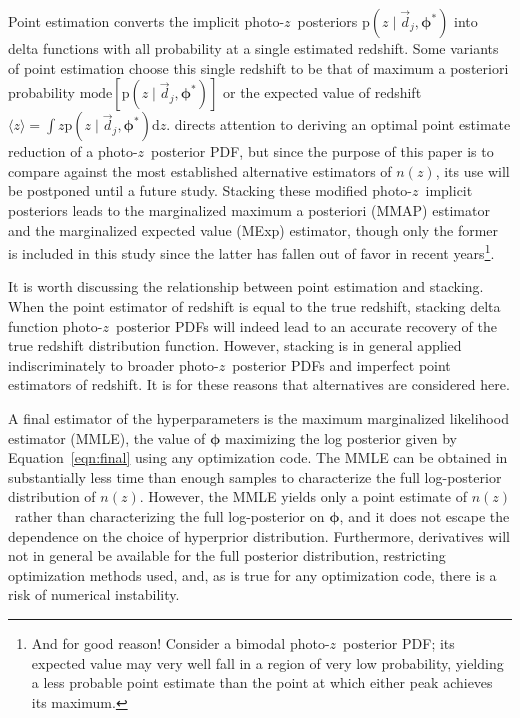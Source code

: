 \documentclass[iop]{emulateapj}
\newcommand{\Eq}[1]{Equation~\ref{#1}}
\newcommand{\data}{\ensuremath{\vec{d}}}%
\newcommand{\pr}[1]{\ensuremath{\mathrm{p}(#1)}}%
\newcommand{\gvn}{\mid}%
\newcommand{\integral}[2]{\ensuremath{\int #1 \mathrm{d} #2}}
\newcommand{\pz}{photo-$z$}
\newcommand{\pzpdf}{\pz\ posterior PDF}%
\newcommand{\pzip}{\pz\ implicit posterior}
\newcommand{\nz}{$n(z)$}
\newcommand{\bvec}[1]{\ensuremath{\boldsymbol{#1}}}%
\newcommand{\ndphi}{\bvec{\phi}}
\begin{document}
Point estimation converts the implicit \pz\ posteriors $\pr{z \gvn \data_{j}, \ndphi^{*}}$ into delta functions with all probability at a single estimated redshift.  
Some variants of point estimation choose this single redshift to be that of maximum a posteriori probability $\mathrm{mode}[\pr{z \gvn \data_{j}, \ndphi^{*}}]$ or the expected value of redshift $\langle z \rangle = \integral{z \pr{z \gvn \data_{j}, \ndphi^{*}}}{z}$.
\citet{tanaka_photometric_2018} directs attention to deriving an optimal point estimate reduction of a \pzpdf, but since the purpose of this paper is to compare against the most established alternative estimators of \nz, its use will be postponed until a future study.
Stacking these modified \pzip s leads to the marginalized maximum a posteriori (MMAP) estimator and the marginalized expected value (MExp) estimator, though only the former is included in this study since the latter has fallen out of favor in recent years\footnote{And for good reason!  Consider a bimodal \pzpdf; its expected value may very well fall in a region of very low probability, yielding a less probable point estimate than the point at which either peak achieves its maximum.}.

It is worth discussing the relationship between point estimation and stacking.  
When the point estimator of redshift is equal to the true redshift, stacking delta function \pzpdf s will indeed lead to an accurate recovery of the true redshift distribution function.  
However, stacking is in general applied indiscriminately to broader \pzpdf s and imperfect point estimators of redshift.  
It is for these reasons that alternatives are considered here.

A final estimator of the hyperparameters is the maximum marginalized likelihood estimator (MMLE), the value of $\ndphi$ maximizing the log posterior given by \Eq{eqn:final} using any optimization code. 
The MMLE can be obtained in substantially less time than enough samples to characterize the full log-posterior distribution of \nz.
However, the MMLE yields only a point estimate of \nz\ rather than characterizing the full log-posterior on $\ndphi$, and it does not escape the dependence on the choice of hyperprior distribution.  
Furthermore, derivatives will not in general be available for the full posterior distribution, restricting optimization methods used, and, as is true for any optimization code, there is a risk of numerical instability.
\end{document}
